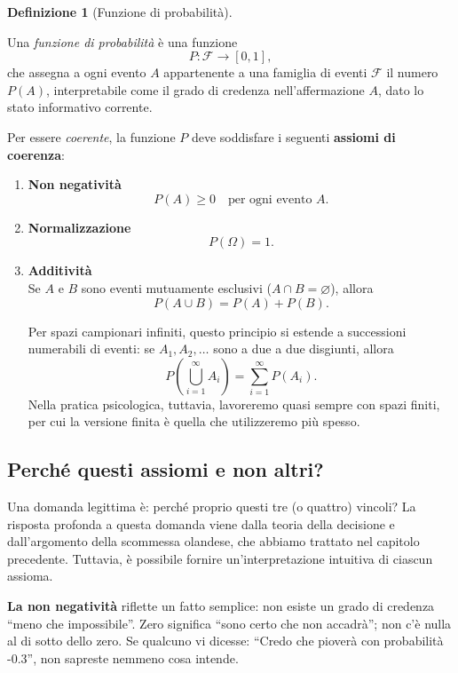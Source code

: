 \documentclass[
  italian,
  letterpaper,
  a4paper,
  11pt,
  open=any]{scrbook}
\theoremstyle{plain}
\theoremstyle{definition}
\theoremstyle{definition}
\newtheorem{definition}{Definizione}[chapter]
\theoremstyle{remark}
\begin{document}
\begin{definition}[Funzione di
probabilità]\protect\hypertarget{def-probability-measure}{}\label{def-probability-measure}

Una \emph{funzione di probabilità} è una funzione \[
P: \mathcal{F} \to [0,1],
\] che assegna a ogni evento \(A\) appartenente a una famiglia di eventi
\(\mathcal{F}\) il numero \(P(A)\), interpretabile come il grado di
credenza nell'affermazione \(A\), dato lo stato informativo corrente.

Per essere \emph{coerente}, la funzione \(P\) deve soddisfare i seguenti
\textbf{assiomi di coerenza}:

\begin{enumerate}
\def\labelenumi{\arabic{enumi}.}
\item
  \textbf{Non negatività}\\
  \[P(A) \geq 0 \quad \text{per ogni evento } A.\]
\item
  \textbf{Normalizzazione}\\
  \[P(\Omega) = 1.\]
\item
  \textbf{Additività}\\
  Se \(A\) e \(B\) sono eventi mutuamente esclusivi
  (\(A \cap B = \varnothing\)), allora \[P(A \cup B) = P(A) + P(B).\]

  Per spazi campionari infiniti, questo principio si estende a
  successioni numerabili di eventi: se \(A_1, A_2, \ldots\) sono a due a
  due disgiunti, allora
  \[P\!\left(\bigcup_{i=1}^{\infty} A_i\right) = \sum_{i=1}^{\infty} P(A_i).\]
  Nella pratica psicologica, tuttavia, lavoreremo quasi sempre con spazi
  finiti, per cui la versione finita è quella che utilizzeremo più
  spesso.
\end{enumerate}

\end{definition}

\subsection{Perché questi assiomi e non
altri?}\label{perchuxe9-questi-assiomi-e-non-altri}

Una domanda legittima è: perché proprio questi tre (o quattro) vincoli?
La risposta profonda a questa domanda viene dalla teoria della decisione
e dall'argomento della scommessa olandese, che abbiamo trattato nel
capitolo precedente. Tuttavia, è possibile fornire un'interpretazione
intuitiva di ciascun assioma.

\textbf{La non negatività} riflette un fatto semplice: non esiste un
grado di credenza ``meno che impossibile''. Zero significa ``sono certo
che non accadrà''; non c'è nulla al di sotto dello zero. Se qualcuno vi
dicesse: ``Credo che pioverà con probabilità -0.3'', non sapreste
nemmeno cosa intende.
\end{document}
